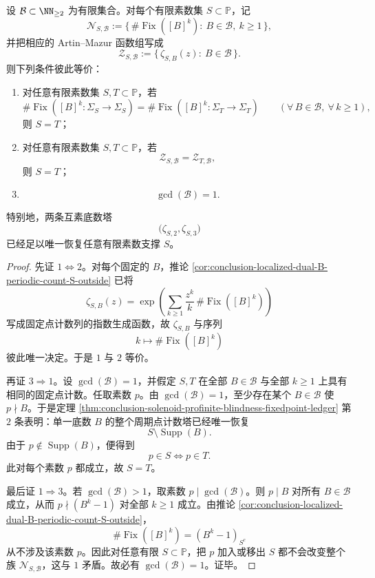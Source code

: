 \begin{theorem}\label{thm:conclusion-localized-solenoid-coprime-artin-mazur-completeness}
设 \(\mathcal B\subset \NN_{\ge 2}\) 为有限集合。对每个有限素数集 \(S\subset \mathbb P\)，记
\[
\mathcal N_{S,\mathcal B}
:=
\{\,\#\operatorname{Fix}([B]^k):\ B\in\mathcal B,\ k\ge 1\,\},
\]
并把相应的 Artin--Mazur 函数组写成
\[
\mathcal Z_{S,\mathcal B}
:=
\{\,\zeta_{S,B}(z):\ B\in\mathcal B\,\}.
\]
则下列条件彼此等价：
\begin{enumerate}
\item 对任意有限素数集 \(S,T\subset \mathbb P\)，若
\[
\#\operatorname{Fix}([B]^k\!:\Sigma_S\to\Sigma_S)
=
\#\operatorname{Fix}([B]^k\!:\Sigma_T\to\Sigma_T)
\qquad (\forall\,B\in\mathcal B,\ \forall\,k\ge 1),
\]
则 \(S=T\)；
\item 对任意有限素数集 \(S,T\subset \mathbb P\)，若
\[
\mathcal Z_{S,\mathcal B}=\mathcal Z_{T,\mathcal B},
\]
则 \(S=T\)；
\item
\[
\gcd(\mathcal B)=1.
\]
\end{enumerate}
特别地，两条互素底数塔
\[
\bigl(\zeta_{S,2},\zeta_{S,3}\bigr)
\]
已经足以唯一恢复任意有限素数支撑 \(S\)。
\end{theorem}
\begin{proof}
先证 \(1\Leftrightarrow 2\)。对每个固定的 \(B\)，推论 \ref{cor:conclusion-localized-dual-B-periodic-count-S-outside} 已将
\[
\zeta_{S,B}(z)
=
\exp\!\left(
\sum_{k\ge 1}\frac{z^k}{k}\,\#\operatorname{Fix}([B]^k)
\right)
\]
写成固定点计数列的指数生成函数，故 \(\zeta_{S,B}\) 与序列
\[
k\longmapsto \#\operatorname{Fix}([B]^k)
\]
彼此唯一决定。于是 \(1\) 与 \(2\) 等价。

再证 \(3\Rightarrow 1\)。设 \(\gcd(\mathcal B)=1\)，并假定 \(S,T\) 在全部 \(B\in\mathcal B\) 与全部 \(k\ge 1\) 上具有相同的固定点计数。任取素数 \(p\)。由 \(\gcd(\mathcal B)=1\)，至少存在某个 \(B\in\mathcal B\) 使 \(p\nmid B\)。于是定理 \ref{thm:conclusion-solenoid-profinite-blindness-fixedpoint-ledger} 第 \(2\) 条表明：单一底数 \(B\) 的整个周期点计数塔已经唯一恢复
\[
S\setminus \operatorname{Supp}(B).
\]
由于 \(p\notin \operatorname{Supp}(B)\)，便得到
\[
p\in S\iff p\in T.
\]
此对每个素数 \(p\) 都成立，故 \(S=T\)。

最后证 \(1\Rightarrow 3\)。若 \(\gcd(\mathcal B)>1\)，取素数 \(p\mid \gcd(\mathcal B)\)。则 \(p\mid B\) 对所有 \(B\in\mathcal B\) 成立，从而 \(p\nmid (B^k-1)\) 对全部 \(k\ge 1\) 成立。由推论 \ref{cor:conclusion-localized-dual-B-periodic-count-S-outside}，
\[
\#\operatorname{Fix}([B]^k)
=(B^k-1)_{S^c}
\]
从不涉及该素数 \(p\)。因此对任意有限 \(S\subset\mathbb P\)，把 \(p\) 加入或移出 \(S\) 都不会改变整个族 \(\mathcal N_{S,\mathcal B}\)，这与 \(1\) 矛盾。故必有 \(\gcd(\mathcal B)=1\)。证毕。
\end{proof}

